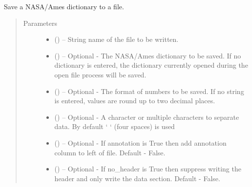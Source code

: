 \documentclass[a4paper,10pt,openany,english]{sphinxmanual}
\begin{document}
\begin{fulllineitems}
\begin{fulllineitems}
\label{egadsapi:egads.input.nasa_ames_io.NasaAmes.save_na_file}
Save a NASA/Ames dictionary to a file.
\begin{quote}\begin{description}
\item[{Parameters}] \leavevmode\begin{itemize}
\item {} 
 () -- String name of the file to be written.

\item {} 
 () -- Optional - The NASA/Ames dictionary to be saved. If no dictionary is entered,
the dictionary currently opened during the open file process will be saved.

\item {} 
 () -- Optional - The format of numbers to be saved. If no string is entered, values are
round up to two decimal places.

\item {} 
 () -- Optional - A character or multiple characters to separate data. By default `    ` (four
spaces) is used

\item {} 
 () -- Optional - If annotation is True then add annotation column to left of file. Default - 
False.

\item {} 
 () -- Optional - If no\_header is True then suppress writing the header and only write the 
data section. Default - False.

\end{itemize}

\end{description}\end{quote}

\end{fulllineitems}


\end{fulllineitems}
\end{document}
